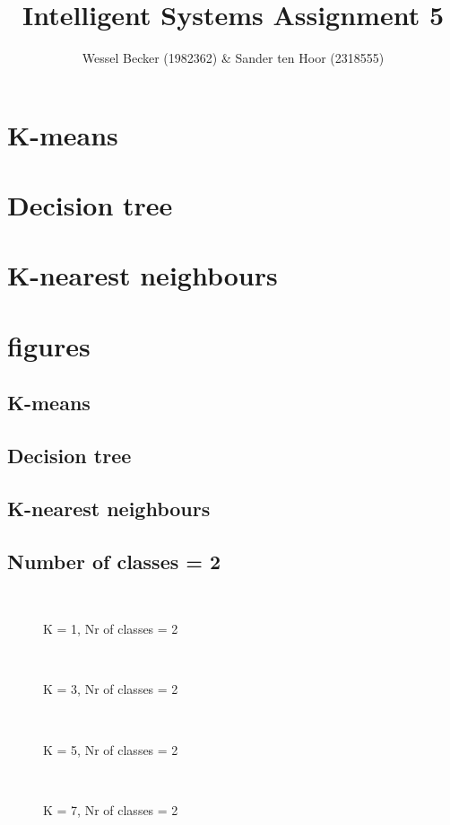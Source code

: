 \documentclass[10pt,a4paper]{article}
\begin{document}
\title{Intelligent Systems Assignment 5}
\author{Wessel Becker (1982362) \& Sander ten Hoor (2318555)}
\maketitle

\newcommand{\simplefigure}[3]{
	\begin{figure}[H]
  	\centering
    	\makebox[\textwidth]
    	{
    		\texttt{[image: \#1]}
 		} \\
  		\caption{#2}
  		\label{#3}
	\end{figure}
}
\newcommand{\mcode}[1]{
	
}

\section{K-means}
\section{Decision tree}
\section{K-nearest neighbours}


\appendix
\section{figures}
\subsection{K-means}
\subsection{Decision tree}
\subsection{K-nearest neighbours}
\subsection{Number of classes = 2}
\simplefigure{./matlab/img/3_1_2.png}{K = 1, Nr of classes = 2}{fig:3_1_2}
\simplefigure{./matlab/img/3_3_2.png}{K = 3, Nr of classes = 2}{fig:3_1_2}
\simplefigure{./matlab/img/3_5_2.png}{K = 5, Nr of classes = 2}{fig:3_1_2}
\simplefigure{./matlab/img/3_7_2.png}{K = 7, Nr of classes = 2}{fig:3_1_2}
\end{document}
